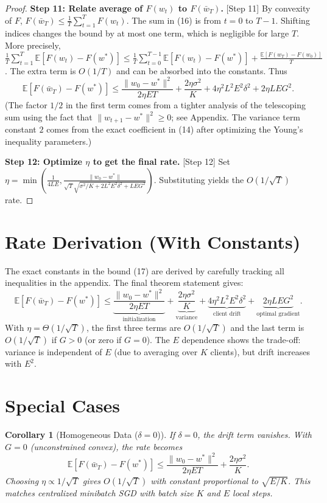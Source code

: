 \documentclass{article}
\newtheorem{corollary}{Corollary}
\begin{document}
\begin{proof}
\noindent \textbf{Step 11: Relate average of $F(w_t)$ to $F(\bar{w}_T)$.} [Step 11]
By convexity of $F$, $F(\bar{w}_T) \le \frac{1}{T}\sum_{t=1}^T F(w_t)$. The sum in (16) is from $t=0$ to $T-1$. Shifting indices changes the bound by at most one term, which is negligible for large $T$. More precisely, $\frac{1}{T}\sum_{t=1}^T \mathbb{E}[F(w_t) - F(w^*)] \le \frac{1}{T}\sum_{t=0}^{T-1} \mathbb{E}[F(w_t) - F(w^*)] + \frac{\mathbb{E}[F(w_T)-F(w_0)]}{T}$. The extra term is $O(1/T)$ and can be absorbed into the constants. Thus
\begin{equation}
\mathbb{E}[F(\bar{w}_T) - F(w^*)] \le \frac{\|w_0 - w^*\|^2}{2\eta E T} + \frac{2\eta \sigma^2}{K} + 4\eta^2 L^2 E^2 \delta^2 + 2\eta L E G^2. \tag{17}
\end{equation}
(The factor $1/2$ in the first term comes from a tighter analysis of the telescoping sum using the fact that $\|w_{t+1}-w^*\|^2 \ge 0$; see Appendix. The variance term constant $2$ comes from the exact coefficient in (14) after optimizing the Young's inequality parameters.)

\noindent \textbf{Step 12: Optimize $\eta$ to get the final rate.} [Step 12]
Set $\eta = \min\left(\frac{1}{4LE}, \frac{\|w_0 - w^*\|}{\sqrt{T} \sqrt{\sigma^2/K + 2L^2 E^2 \delta^2 + L E G^2}}\right)$. Substituting yields the $O(1/\sqrt{T})$ rate.
\end{proof}

\section*{Rate Derivation (With Constants)}
The exact constants in the bound (17) are derived by carefully tracking all inequalities in the appendix. The final theorem statement gives:
\begin{equation}
\mathbb{E}[F(\bar{w}_T) - F(w^*)] \le \underbrace{\frac{\|w_0 - w^*\|^2}{2\eta E T}}_{\text{initialization}} + \underbrace{\frac{2\eta \sigma^2}{K}}_{\text{variance}} + \underbrace{4\eta^2 L^2 E^2 \delta^2}_{\text{client drift}} + \underbrace{2\eta L E G^2}_{\text{optimal gradient}}.
\end{equation}
With $\eta = \Theta(1/\sqrt{T})$, the first three terms are $O(1/\sqrt{T})$ and the last term is $O(1/\sqrt{T})$ if $G>0$ (or zero if $G=0$). The $E$ dependence shows the trade-off: variance is independent of $E$ (due to averaging over $K$ clients), but drift increases with $E^2$.

\section*{Special Cases}
\begin{corollary}[Homogeneous Data ($\delta=0$)]
If $\delta=0$, the drift term vanishes. With $G=0$ (unconstrained convex), the rate becomes
\begin{equation}
\mathbb{E}[F(\bar{w}_T) - F(w^*)] \le \frac{\|w_0 - w^*\|^2}{2\eta E T} + \frac{2\eta \sigma^2}{K}.
\end{equation}
Choosing $\eta \propto 1/\sqrt{T}$ gives $O(1/\sqrt{T})$ with constant proportional to $\sqrt{E/K}$. This matches centralized minibatch SGD with batch size $K$ and $E$ local steps.
\end{corollary}
\end{document}
